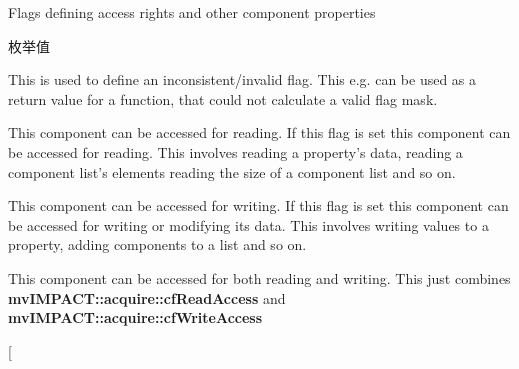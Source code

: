 Flags defining access rights and other component properties \begin{Desc}
\item[枚举值]\par
\begin{description}
\item[{\em 
\hypertarget{group___common_interface_gga4ef1be7cf1ca9dd256fd3060dd0787bba478aae8537b90163ce38f4fd1a4b4e78}{cf\+Undefined}\label{group___common_interface_gga4ef1be7cf1ca9dd256fd3060dd0787bba478aae8537b90163ce38f4fd1a4b4e78}
}]This is used to define an inconsistent/invalid flag. This e.\+g. can be used as a return value for a function, that could not calculate a valid flag mask. \item[{\em 
\hypertarget{group___common_interface_gga4ef1be7cf1ca9dd256fd3060dd0787bba7cd2bea9a28885a98ce6500ea75c25cf}{cf\+Read\+Access}\label{group___common_interface_gga4ef1be7cf1ca9dd256fd3060dd0787bba7cd2bea9a28885a98ce6500ea75c25cf}
}]This component can be accessed for reading. If this flag is set this component can be accessed for reading. This involves reading a property's data, reading a component list's elements reading the size of a component list and so on. \item[{\em 
\hypertarget{group___common_interface_gga4ef1be7cf1ca9dd256fd3060dd0787bbab9f29e4a0ced76f2aab738ebd5eea199}{cf\+Write\+Access}\label{group___common_interface_gga4ef1be7cf1ca9dd256fd3060dd0787bbab9f29e4a0ced76f2aab738ebd5eea199}
}]This component can be accessed for writing. If this flag is set this component can be accessed for writing or modifying its data. This involves writing values to a property, adding components to a list and so on. \item[{\em 
\hypertarget{group___common_interface_gga4ef1be7cf1ca9dd256fd3060dd0787bba539592b85e24efc5e5d4451eb2ebccea}{cf\+R\+W\+Access}\label{group___common_interface_gga4ef1be7cf1ca9dd256fd3060dd0787bba539592b85e24efc5e5d4451eb2ebccea}
}]This component can be accessed for both reading and writing. This just combines {\bfseries mv\+I\+M\+P\+A\+C\+T\+::acquire\+::cf\+Read\+Access} and {\bfseries mv\+I\+M\+P\+A\+C\+T\+::acquire\+::cf\+Write\+Access} \item[{\em 
}
\end{description}
\end{Desc}
